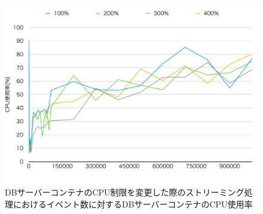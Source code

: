 \documentclass[../../../../../main]{subfiles}
\begin{document}
    \begin{figure}[H]
        \centering
        \includegraphics[width=12cm]{graph}
        \caption{DBサーバーコンテナのCPU制限を変更した際のストリーミング処理におけるイベント数に対するDBサーバーコンテナのCPU使用率}
        \label{fig:stream-change-db-cpu-limit-db-cpu-app_4_8192-db_1024}
    \end{figure}
\end{document}
